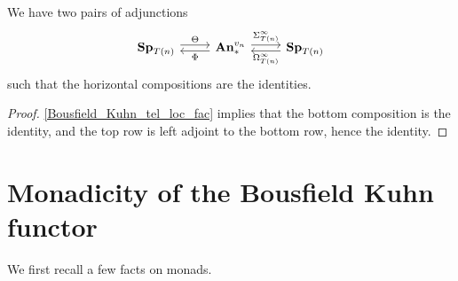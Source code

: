 	\begin{coro}\label{Bousfield_Kuhn_susp_loop_adj}
		We have two pairs of adjunctions 
		\[\begin{tikzcd}[ampersand replacement=\&]
			{\Sp_{T(n)}} \& {\An_*^{v_n}} \& {\Sp_{T(n)}}
			\arrow["\Theta", shift left, from=1-1, to=1-2]
			\arrow["\Phi", shift left, from=1-2, to=1-1]
			\arrow["{\Sigma^\infty_{T(n)}}", shift left, from=1-2, to=1-3]
			\arrow["{\Omega^\infty_{T(n)}}", shift left, from=1-3, to=1-2]
		\end{tikzcd}\]
		such that the horizontal compositions are the identities. 
	\end{coro}
	\begin{proof}
		\cref{Bousfield_Kuhn_tel_loc_fac} implies that the bottom composition is the identity, and the top row is left adjoint to the bottom row, hence the identity. 
	\end{proof}

\section{Monadicity of the Bousfield Kuhn functor}

	We first recall a few facts on monads. 

